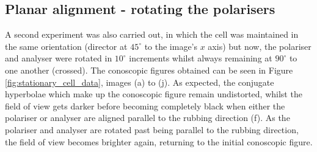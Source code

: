 \subsection{Planar alignment - rotating the polarisers}
A second experiment was also carried out, in which the cell was maintained in the same orientation (director at $45^\circ$ to the image's $x$ axis) but now, the polariser and analyser were rotated in $10^\circ$ increments whilst always remaining at $90^\circ$ to one another (crossed). The conoscopic figures obtained can be seen in Figure \ref{fig:stationary_cell_data}, images (a) to (j). As expected, the conjugate hyperbolae which make up the conoscopic figure remain undistorted, whilst the field of view gets darker before becoming completely black when either the polariser or analyser are aligned parallel to the rubbing direction (f). As the polariser and analyser are rotated past being parallel to the rubbing direction, the field of view becomes brighter again, returning to the initial conoscopic figure.

